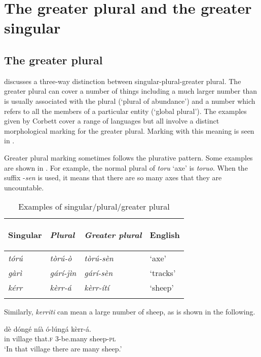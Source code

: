 \documentclass[output=paper]{langsci/langscibook}
\begin{document}
\section{The greater plural and the greater singular} \label{sec:moodie:5}


\subsection{The greater plural} \label{sec:moodie:5.1}

\citet[30]{Corbett2000} discusses a three-way distinction between singular-plural-greater plural. The greater plural can cover a number of things including a much larger number than is usually associated with the plural (‘plural of abundance’) and a number which refers to all the members of a particular entity (‘global plural’). The examples given by Corbett cover a range of languages but all involve a distinct morphological marking for the greater plural. Marking with this meaning is seen in . 

Greater plural marking sometimes follows the plurative pattern. Some examples are shown in . For example, the normal plural of \textit{toru} ‘axe’ is \textit{toruo}. When the suffix -\textit{sen }is used, it means that there are so many axes that they are uncountable.

\begin{table}
\begin{tabularx}{\textwidth}{>{\itshape}X>{\itshape}X>{\itshape}XX}
\lsptoprule

 \textup{Singular} & \textup{Plural} & \textup{Greater plural} & {English}\\ \midrule
 tórú &  tòrú-ò &  tòrú-sèn &  ‘axe’\\
 gàrì &  gárí-jìn &  gárí-sèn &  ‘tracks’\\
 kérr &  kèrr-á &  kèrr-ítí &  ‘sheep’\\
\lspbottomrule
\end{tabularx}
\caption{Examples of singular/plural/greater plural}
\label{tab:moodie:17}
\end{table}

Similarly, \textit{kerriti} can mean a large number of sheep, as is shown in the following.

\ea\label{ex:moodie:6}
\gll dè dóngé níà ó-lúngá kèrr-á. \\
in village that.\textsc{f} 3-be.many sheep-\textsc{pl} \\
\glt ‘In that village there are many sheep.’
\z
\end{document}
